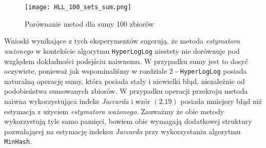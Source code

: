 \begin{figure}[h!]
    \texttt{[image: HLL\_100\_sets\_sum.png]}
    \centering
    \caption{Porównanie metod dla sumy 100 zbiorów}
    \label{fig:HLL_100_sets_sum}
\end{figure}

Wnioski wynikające z tych eksperymentów sugerują, że metoda \textit{estymatora ważonego} w kontekście algorytmu \texttt{HyperLogLog} niestety nie dorównuje pod względem dokładności podejściu naiwnemu. W przypadku sumy jest to dosyć oczywiste, ponieważ jak wspominaliśmy w rozdziale 2 - \texttt{HyperLogLog} posiada naturalną operację sumy, która posiada stały i niewielki błąd, niezależnie od podobieństwa sumowanych zbiorów. W przypadku operacji przekroju metoda naiwna wykorzystująca indeks \textit{Jaccarda} i wzór $(2.19)$ posiada mniejszy błąd niż estymacja z użyciem \textit{estymatora ważonego}. Zauważmy że obie metody wykorzystują tyle samo pamięci, bowiem obie wymagają dodatkowej struktury pozwalającej na estymację indeksu \textit{Jaccarda} przy wykorzystaniu algorytmu \texttt{MinHash}.